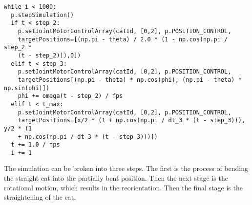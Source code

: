 \documentclass[12]{amsart}
\theoremstyle{definition}
\begin{document}
\begin{verbatim}
while i < 1000:
  p.stepSimulation()
  if t < step_2:
    p.setJointMotorControlArray(catId, [0,2], p.POSITION_CONTROL,
    targetPositions=[(np.pi - theta) / 2.0 * (1 - np.cos(np.pi / step_2 *
    (t - step_2))),0])
  elif t < step_3:
    p.setJointMotorControlArray(catId, [0,2], p.POSITION_CONTROL,
    targetPositions[(np.pi - theta) * np.cos(phi), (np.pi - theta) * np.sin(phi)])
    phi += omega(t - step_2) / fps
  elif t < t_max:
    p.setJointMotorControlArray(catId, [0,2], p.POSITION_CONTROL,
    targetPositions=[x/2 * (1 + np.cos(np.pi / dt_3 * (t - step_3))), y/2 * (1
    + np.cos(np.pi / dt_3 * (t - step_3)))])
  t += 1.0 / fps
  i += 1
\end{verbatim}
The simulation can be broken into three steps. The first is the process of
bending the straight cat into the partially bent position. Then the next stage
is the rotational motion, which results in the reorientation. Then the final
stage is the straightening of the cat.
\end{document}
